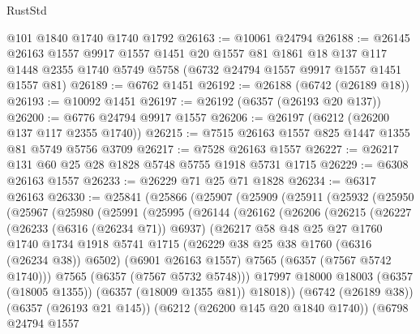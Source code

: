 \begin{lexlean}{RustStd}
\begin{coremodule}
    @101
    @1840
    @1740
    @1740
    @1792
@26163 := @10061 @24794
@26188 := @26145
    @26163
    @1557
    @9917
    @1557
    @1451
    @20
    @1557
    @81
    @1861
    @18
    @137
    @117
    @1448
    @2355
    @1740
    @5749
    @5758
    (@6732 @24794 @1557 @9917 @1557 @1451 @1557 @81)
@26189 := @6762 @1451
@26192 := @26188 (@6742 (@26189 @18))
@26193 := @10092 @1451
@26197 := @26192 (@6357 (@26193 @20 @137))
@26200 := @6776 @24794 @9917 @1557
@26206 := @26197 (@6212 (@26200 @137 @117 @2355 @1740))
@26215 := @7515 @26163 @1557 @825 @1447 @1355 @81 @5749 @5756 @3709
@26217 := @7528 @26163 @1557
@26227 := @26217 @131 @60 @25 @28 @1828 @5748 @5755 @1918 @5731 @1715
@26229 := @6308 @26163 @1557
@26233 := @26229 @71 @25 @71 @1828
@26234 := @6317 @26163
@26330 := @25841
    (@25866
      (@25907
        (@25909
          (@25911
            (@25932
              (@25950
                (@25967
                  (@25980
                    (@25991
                      (@25995
                        (@26144
                          (@26162
                            (@26206
                              (@26215
                                (@26227
                                  (@26233 (@6316 (@26234 @71)) @6937)
                                  (@26217
                                    @58
                                    @48
                                    @25
                                    @27
                                    @1760
                                    @1740
                                    @1734
                                    @1918
                                    @5741
                                    @1715
                                    (@26229 @38 @25 @38 @1760 (@6316 (@26234 @38)) @6502)
                                    (@6901 @26163 @1557)
                                    @7565
                                    (@6357 (@7567 @5742 @1740)))
                                  @7565
                                  (@6357 (@7567 @5732 @5748)))
                                @17997
                                @18000
                                @18003
                                (@6357 (@18005 @1355))
                                (@6357 (@18009 @1355 @81))
                                @18018))
                            (@6742 (@26189 @38))
                            (@6357 (@26193 @21 @145))
                            (@6212 (@26200 @145 @20 @1840 @1740))
                            (@6798
                              @24794
                              @1557

\end{coremodule}
\end{lexlean}
